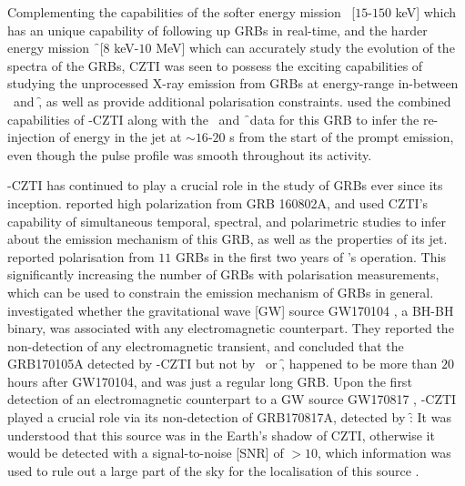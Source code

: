 Complementing the capabilities of the softer energy mission \s\ [$15$-$150$ keV] which has an unique capability of following up GRBs in real-time, and the harder energy mission \f\ [$8$ keV-$10$ MeV] which can accurately study the evolution of the spectra of the GRBs, CZTI was seen to possess the exciting capabilities of studying the unprocessed X-ray emission from GRBs at energy-range in-between \s\ and \f, as well as provide additional polarisation constraints. \cite{Basak_et_al.-2017-MNRAS} used the combined capabilities of \AS -CZTI along with the \s\ and \f\ data for this GRB to infer the re-injection of energy in the jet at $\sim 16$-$20$ s from the start of the prompt emission, even though the pulse profile was smooth throughout its activity.

\AS -CZTI has continued to play a crucial role in the study of GRBs ever since its inception. \cite{Chand_et_al.-2018-ApJ} reported high polarization from GRB 160802A, and used CZTI's capability of simultaneous temporal,  spectral, and polarimetric studies to infer about the emission mechanism of this GRB, as well as the properties of its jet. \cite{Chattopadhyay_et_al.-2017-arXiv} reported polarisation from $11$ GRBs in the first two years of \AS 's operation. This significantly increasing the number of GRBs with polarisation measurements, which can be used to constrain the emission mechanism of GRBs in general. \cite{Bhalerao_et_al.-2017-ApJ-A_Tale_of_Two_Transients} investigated whether the gravitational wave [GW] source GW170104 \citep{GW170104-2017}, a BH-BH binary, was associated with any electromagnetic counterpart. They reported the non-detection of any electromagnetic transient, and concluded that the GRB170105A detected by \AS -CZTI but not by \s\ or \f,  happened to be more than $20$ hours after GW170104, and was just a regular long GRB. Upon the first detection of an electromagnetic counterpart to a GW source GW170817 \citep{GW170817-2017, EM170817-2017}, \AS -CZTI played a crucial role via its non-detection of GRB170817A, detected by \f: It was understood that this source was in the Earth's shadow of CZTI, otherwise it would be detected with a signal-to-noise [SNR] of $> 10$, which information was used to rule out a large part of the sky for the localisation of this source \citep{Kasliwal_et_al.-2017-Science}.

